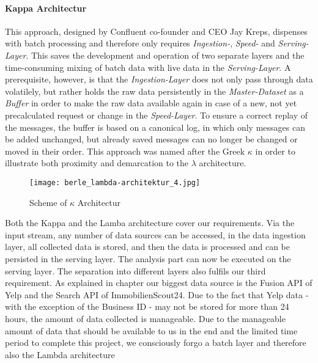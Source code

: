 \paragraph{Kappa Architectur}
This approach, designed by Confluent co-founder and CEO Jay Kreps, dispenses with batch processing and therefore only requires
\textit{Ingestion-}, \textit{Speed-} and \textit{Serving-Layer}.
This saves the development and operation of two separate layers and the time-consuming mixing of batch data with live data in the \textit{Serving-Layer}.
A prerequisite, however, is that the \textit{Ingestion-Layer} does not only pass through data volatilely,
but rather holds the raw data persistently in the \textit{Master-Dataset} as a \textit{Buffer} in order to make the raw data available again in case of a new,
not yet precalculated request or change in the \textit{Speed-Layer}.
To ensure a correct replay of the messages, the buffer is based on a canonical log, in which only messages can be added unchanged, but already saved messages can no
longer be changed or moved in their order.
This approach was named after the Greek $\kappa$ in order to illustrate both proximity and demarcation to the $\lambda$ architecture.
\cite{Kappa} \cite{Kappa2}
\begin{figure}[h]
	\centering
	\texttt{[image: berle\_lambda-architektur\_4.jpg]}
	\caption[Scheme of $\kappa$ Architectur]{Scheme of $\kappa$ Architectur\cite{jaxkappa}}
	\label{fig:KappaArchitecture}
\end{figure}
Both the Kappa and the Lamba architecture cover our requirements.
Via the input stream, any number of data sources can be accessed, in the
data ingestion layer, all collected data is stored, and then the data is processed and can be persisted in the serving layer.
The analysis part can now be executed on the serving layer.
The separation into different layers also fulfils our third requirement.
\newline
As explained in chapter  our biggest data source is the Fusion \ac{API} of Yelp and
the Search \ac{API} of ImmobilienScout24.
Due to the fact that Yelp data - with the exception of the Business ID - may not be stored for more than 24 hours,\cite{YelpFaq}
the amount of data collected is manageable.
\newline
Due to the manageable amount of data that should be available to us in the end and the limited time period to complete this project,
we consciously forgo a batch layer and therefore also the Lambda architecture
